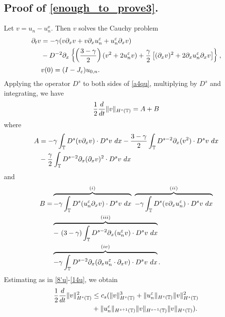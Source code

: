 \subsection{Proof of \eqref{enough_to_prove3}.} 
Let $v = u_n - u^\ee_n$. Then $v$ solves the Cauchy problem
\begin{align}
\label{a4qu}
\partial_t v 
& =  -\gamma (v \partial_x v + v \partial_x u^\varepsilon_n + u^\varepsilon_n \partial_x v)  
\\
& - D^{-2} \partial_x \left\{ \left (\frac{3-\gamma}{2} \right )(v^2 +
2u^\varepsilon_n v) + \frac{\gamma}{2}\left[ (\partial_x v)^2 + 2 \partial_x u^\varepsilon_n \partial_x v \right]
\right\}, \notag
\\
& v(0) = (I- J_\varepsilon)u_{0,n}.
\label{a5qu}
\end{align}
Applying the operator $D^s$ to both sides of \eqref{a4qu}, multiplying by
$D^s$ and integrating, we have
\begin{equation}
\begin{split}
\frac{1}{2}\frac{d}{dt} \|v\|_{H^s(\mathbb{T})} = A + B
\label{a6qu}
\end{split}
\end{equation}
where
\begin{equation}
\begin{split}
A
& =  -\gamma \int_{\mathbb{T}} D^s(v \partial_x v) \cdot D^s v \
dx
- \frac{3- \gamma}{2} \int_{\mathbb{T}} D^{s-2} \partial_x (v^2) \cdot D^s v
\ dx
\\
& - \frac{\gamma}{2}\int_{\mathbb{T}} D^{s-2} \partial_x (\partial_x v)^2 \cdot D^s
v \ dx
\label{a7qu}
\end{split}
\end{equation}
and
\begin{equation}
\begin{split}
B 
= &  \overbrace{-\gamma \int_{\mathbb{T}} D^s (u^\varepsilon_n \partial_x v) \cdot D^s v \
dx}^{(i)}
\ \overbrace{-\gamma \int_{\mathbb{T}} D^s (v \partial_x u^\varepsilon_n ) \cdot D^s v \
dx}^{(ii)}
\\
& \overbrace{- \ ( 3- \gamma) \int_{\mathbb{T}} D^{s-2} \partial_x (u^\varepsilon_n v) \cdot D^s
v \ dx}^{(iii)}
\\
& \overbrace{-\gamma \int_{\mathbb{T}} D^{s-2} \partial_x
(\partial_x u^\varepsilon_n \cdot \partial_x v) \cdot D^s v \
dx}^{(iv)}.
\label{a8qu}
\end{split}
\end{equation}
Estimating as in \eqref{8'u}-\eqref{14u}, we obtain
\begin{equation}
\begin{split}
\frac{1}{2}\frac{d}{dt}\|v\|_{H^{s}(\mathbb{T})}^2
& \le c_s(\|v\|_{H^s(\mathbb{T})}^3 + \|u^\varepsilon_n\|_{H^s(\mathbb{T})}
\|v\|_{H^s(\mathbb{T})}^2
\\
& + \|u^\varepsilon_n\|_{H^{s+1}(\mathbb{T})}
\|v\|_{H^{s-1}(\mathbb{T})} \|v\|_{H^s(\mathbb{T})}).
\label{a15qu}
\end{split}
\end{equation}

